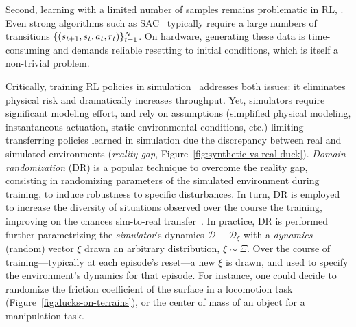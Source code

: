 Second, learning with a limited number of samples remains problematic in RL, .
Even strong algorithms such as SAC~\citep{haarnojaSoftActorCriticOffPolicy2018} typically require a large numbers of transitions \( \{ (s_{t+1}, s_t, a_t, r_t) \}_{t=1}^N \).
On hardware, generating these data is time-consuming and demands reliable resetting to initial conditions, which is itself a non-trivial problem.

Critically, training RL policies in simulation~\citep{tobinDomainRandomizationTransferring2017} addresses both issues: it eliminates physical risk and dramatically increases throughput. 
Yet, simulators require significant modeling effort, and rely on assumptions (simplified physical modeling, instantaneous actuation, static environmental conditions, etc.) limiting transferring policies learned in simulation due the discrepancy between real and simulated environments (\emph{reality gap}, Figure~\ref{fig:synthetic-vs-real-duck}).
\emph{Domain randomization} (DR) is a popular technique to overcome the reality gap, consisting in randomizing parameters of the simulated environment during training, to induce robustness to specific disturbances.
In turn, DR is employed to increase the diversity of situations observed over the course the training, improving on the chances sim-to-real transfer~\citep{openaiSolvingRubiksCube2019,antonovaReinforcementLearningPivoting2017,jiDribbleBotDynamicLegged2023}.
In practice, DR is performed further parametrizing the \emph{simulator}'s dynamics \( \mathcal D \equiv \mathcal D_\xi \) with a \emph{dynamics} (random) vector \( \xi \) drawn an arbitrary distribution, \( \xi \sim \Xi \).
Over the course of training---typically at each episode's reset---a new \( \xi \) is drawn, and used to specify the environment's dynamics for that episode.
For instance, one could decide to randomize the friction coefficient of the surface in a locomotion task (Figure~\ref{fig:ducks-on-terrains}), or the center of mass of an object for a manipulation task.

